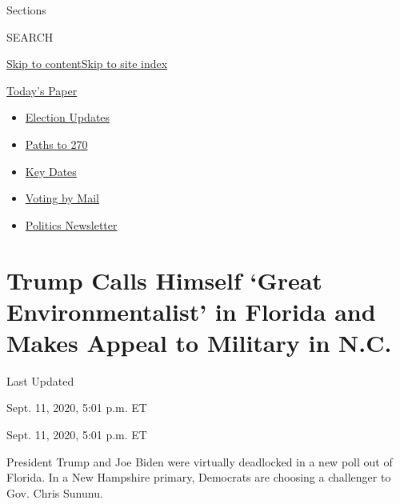 Sections

SEARCH

\protect\hyperlink{site-content}{Skip to
content}\protect\hyperlink{site-index}{Skip to site index}

\href{https://myaccount.nytimes3xbfgragh.onion/auth/login?response_type=cookie\&client_id=vi}{}

\href{https://www.nytimes3xbfgragh.onion/section/todayspaper}{Today's
Paper}

\begin{itemize}
\item
  \href{https://www.nytimes3xbfgragh.onion/live/2020/09/11/us/trump-vs-biden?action=click\&pgtype=Article\&state=default\&region=TOP_BANNER\&context=storylines_menu}{Election
  Updates}
\item
  \href{https://www.nytimes3xbfgragh.onion/interactive/2020/us/elections/election-states-biden-trump.html?action=click\&pgtype=Article\&state=default\&region=TOP_BANNER\&context=storylines_menu}{Paths
  to 270}
\item
  \href{https://www.nytimes3xbfgragh.onion/interactive/2019/us/elections/2020-presidential-election-calendar.html?action=click\&pgtype=Article\&state=default\&region=TOP_BANNER\&context=storylines_menu}{Key
  Dates}
\item
  \href{https://www.nytimes3xbfgragh.onion/interactive/2020/08/31/us/politics/vote-by-mail-deadlines.html?action=click\&pgtype=Article\&state=default\&region=TOP_BANNER\&context=storylines_menu}{Voting
  by Mail}
\item
  \href{https://www.nytimes3xbfgragh.onion/newsletters/politics?action=click\&pgtype=Article\&state=default\&region=TOP_BANNER\&context=storylines_menu}{Politics
  Newsletter}
\end{itemize}

\hypertarget{trump-calls-himself-great-environmentalist-in-florida-and-makes-appeal-to-military-in-nc}{%
\section{Trump Calls Himself `Great Environmentalist' in Florida and
Makes Appeal to Military in
N.C.}\label{trump-calls-himself-great-environmentalist-in-florida-and-makes-appeal-to-military-in-nc}}

Last Updated

Sept. 11, 2020, 5:01 p.m. ET

Sept. 11, 2020, 5:01 p.m. ET

President Trump and Joe Biden were virtually deadlocked in a new poll
out of Florida. In a New Hampshire primary, Democrats are choosing a
challenger to Gov. Chris Sununu.

